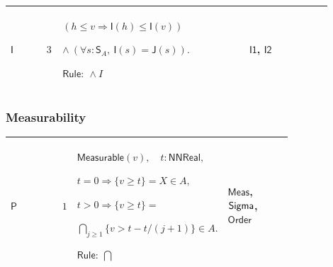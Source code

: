\documentclass[12pt,reqno]{amsart}
\theoremstyle{blueplain}
\numberwithin{equation}{section}
\newlength{\DCTOneColumnBody}
\begin{document}
{\scriptsize \setlength{\parskip}{0pt}\nointerlineskip
\noindent 
\begin{tabular}{|@{}>{\centering\arraybackslash}m{0.10658\linewidth}|>{\centering\arraybackslash}m{0.03553\linewidth}|>{\centering\arraybackslash}m{0.52105\linewidth}|>{\centering\arraybackslash}m{0.23684\linewidth}|}
\hline
\hypertarget{proof:I3}{$\displaystyle \mathsf{I}$} & $\displaystyle 3$ & $%
\displaystyle (h\le v\Rightarrow\mathsf{I}(h)\le\mathsf{I}(v))$\par$%
\displaystyle \land\ (\forall s:\mathsf{S}_A,\ \mathsf{I}(s)=\mathsf{J}(s)).$%
\par$\displaystyle \mathsf{Rule}:\ \land I$ & \hyperlink{proof:I1}{$%
\displaystyle \mathsf{I1}$}, \hyperlink{proof:I2}{$\displaystyle \mathsf{I2}$%
} \\ \hline
\end{tabular}%
}

\subsubsection{\protect\scriptsize Measurability}

{\scriptsize \setlength{\parskip}{0pt}\nointerlineskip
\noindent 
\begin{tabular}{|@{}>{\centering\arraybackslash}m{\DCTOneColumnBody}|}
\hline
$\displaystyle \mathsf{Context\_P}:=$\par$\displaystyle h:\mathsf{PosNat}\to%
\mathsf{F},$\par$\displaystyle \forall n:\mathsf{PosNat},\ \mathsf{Measurable%
}(h_n).$ \\ \hline
\end{tabular}%
}

{\scriptsize \setlength{\parskip}{0pt}\nointerlineskip
\noindent 
\begin{tabular}{|@{}>{\centering\arraybackslash}m{0.10658\linewidth}|>{\centering\arraybackslash}m{0.03553\linewidth}|>{\centering\arraybackslash}m{0.52105\linewidth}|>{\centering\arraybackslash}m{0.23684\linewidth}|}
\hline
\hypertarget{proof:P1}{$\displaystyle \mathsf{P}$} & $\displaystyle 1$ & $%
\displaystyle \mathsf{Measurable}(v),\quad t:\mathsf{NNReal},$\par$%
\displaystyle t=0\Rightarrow\{v\ge t\}=X\in A,$\par$\displaystyle %
t>0\Rightarrow\{v\ge t\}=$\par$\displaystyle \bigcap_{j\ge1}\{v>t-t/(j+1)\}%
\in A.$\par$\displaystyle \mathsf{Rule}:\ \bigcap$ & \hyperlink{def:Meas}{$%
\displaystyle \mathsf{Meas}$}, \hyperlink{ax:Sigma}{$\displaystyle \mathsf{%
Sigma}$}, \hyperlink{ax:Order}{$\displaystyle \mathsf{Order}$} \\ \hline
\end{tabular}%
}
\end{document}

